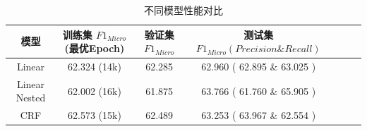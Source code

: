 \documentclass[a4paper]{article}
\begin{document}
\begin{table}[!h]
    \centering
    \begin{tabular}{ccccccc}
        \toprule
        模型 & 训练集 $F1_{Micro}$ (最优Epoch) & 验证集 $F1_{Micro}$ & 测试集 $F1_{Micro}(Precision\&Recall)$  \\
        \midrule
        Linear & 62.324 (14k) & 62.285 & 62.960 ( 62.895 \& 63.025 ) \\
        Linear Nested & 62.002 (16k) & 61.875 & 63.766 ( 61.760 \& 65.905 ) \\ 
        CRF & 62.573 (15k) & 62.489 & 63.253 ( 63.967 \& 62.554 ) \\
        \bottomrule
    \end{tabular}
    \caption{不同模型性能对比}
    \label{apptable:result}
\end{table}
\end{document}
